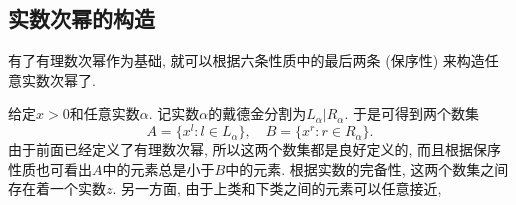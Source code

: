 \subsection{实数次幂的构造}
有了有理数次幂作为基础, 就可以根据六条性质中的最后两条 (保序性) 来构造任意实数次幂了. 

给定$x>0$和任意实数$\alpha$. 记实数$\alpha$的戴德金分割为$L_\alpha|R_\alpha$. 于是可得到两个数集
\[
A=\{x^l:l\in L_\alpha\},\quad B=\{x^r:r\in R_\alpha\}.
\]
由于前面已经定义了有理数次幂, 所以这两个数集都是良好定义的, 而且根据保序性质也可看出$A$中的元素总是小于$B$中的元素. 根据实数的完备性, 这两个数集之间存在着一个实数$z$. 另一方面, 由于上类和下类之间的元素可以任意接近, 